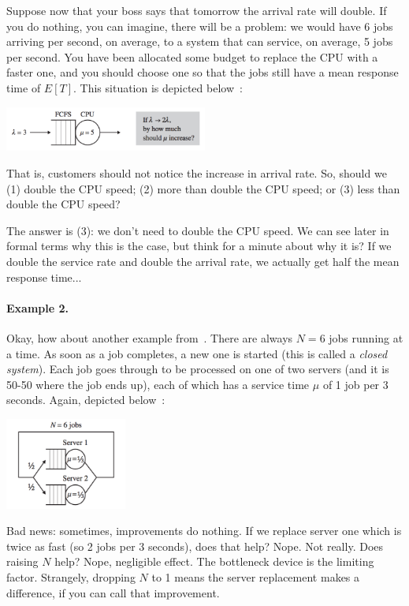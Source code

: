 \documentclass[a4paper]{report}
\begin{document}
Suppose now that your boss says that tomorrow the arrival rate will double. If you do nothing, you can imagine, there will be a problem: we would have 6 jobs arriving per second, on average, to a system that can service, on average, 5 jobs per second. You have been allocated some budget to replace the CPU with a faster one, and you should choose one so that the jobs still have a mean response time of $E[T]$. This situation is depicted below~\cite{pmd}:


\begin{center}
	\includegraphics[width=0.5\textwidth]{images/qt-example1.png}
\end{center}

That is, customers should not notice the increase in arrival rate. So, should we (1) double the CPU speed; (2) more than double the CPU speed; or (3) less than double the CPU speed?

The answer is (3): we don't need to double the CPU speed. We can see later in formal terms why this is the case, but think for a minute about why it is? If we double the service rate and double the arrival rate, we actually get half the mean response time...

\paragraph{Example 2.} Okay, how about another example from~\cite{pmd}. There are always $N=6$ jobs running at a time. As soon as a job completes, a new one is started (this is called a \textit{closed system}). Each job goes through to be processed on one of two servers (and it is 50-50 where the job ends up), each of which has a service time $\mu$ of 1 job per 3 seconds. Again, depicted below~\cite{pmd}:


\begin{center}
	\includegraphics[width=0.3\textwidth]{images/qt-example2.png}
\end{center}

Bad news: sometimes, improvements do nothing. If we replace server one which is twice as fast (so 2 jobs per 3 seconds), does that help? Nope. Not really. Does raising $N$ help? Nope, negligible effect. The bottleneck device is the limiting factor. Strangely, dropping $N$ to 1 means the server replacement makes a difference, if you can call that improvement. 
\end{document}
